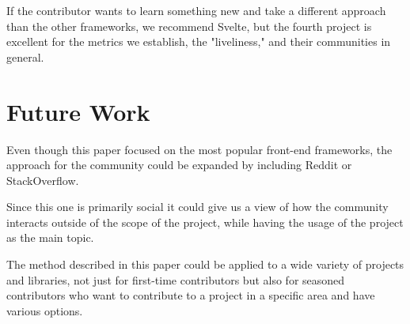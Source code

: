 If the contributor wants to learn something new and take a different approach than the other frameworks, we recommend Svelte, but the fourth project is excellent for the metrics we establish, the "liveliness," and their communities in general.

\section{Future Work}
Even though this paper focused on the most popular front-end frameworks, the approach for the community could be expanded by including Reddit or StackOverflow.

Since this one is primarily social it could give us a view of how the community interacts outside of the scope of the project, while having the usage of the project as the main topic.

The method described in this paper could be applied to a wide variety of projects and libraries, not just for first-time contributors but also for seasoned contributors who want to contribute to a project in a specific area and have various options.
